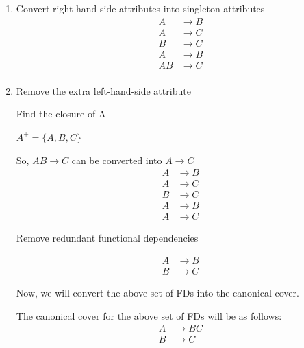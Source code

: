 \documentclass{article}
\begin{document}
\begin{enumerate}
    \item Convert right-hand-side attributes into singleton attributes
    \begin{align*}
        A &\rightarrow B \\
        A &\rightarrow C \\
        B &\rightarrow C \\
        A &\rightarrow B \\
        AB &\rightarrow C \\
    \end{align*}
    
    \item Remove the extra left-hand-side attribute

          Find the closure of A

          $A^+ = \{A, B, C\}$

          So, $AB \rightarrow C$ can be converted into $A \rightarrow C$
          \begin{align*}
              A & \rightarrow B \\
              A & \rightarrow C \\
              B & \rightarrow C \\
              A & \rightarrow B \\
              A & \rightarrow C
          \end{align*}

          Remove redundant functional dependencies

          \begin{align*}
              A & \rightarrow B \\
              B & \rightarrow C
          \end{align*}

          Now, we will convert the above set of FDs into the canonical cover.

          The canonical cover for the above set of FDs will be as follows:
          \begin{align*}
              A & \rightarrow BC \\
              B & \rightarrow C
          \end{align*}
\end{enumerate}
\end{document}
